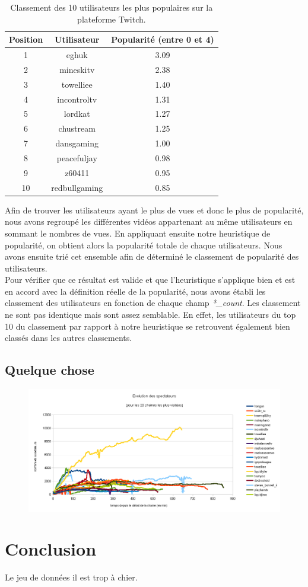 \documentclass[11pt, a4paper, titlepage]{scrartcl}
\begin{document}
\begin{table}[h]
  \centering
   \caption{\label{tab:user_rank} Classement des 10 utilisateurs les plus populaires
   sur la plateforme Twitch.}
   \begin{tabular}{|c|c|c|}
     \hline
     Position & Utilisateur & Popularité (entre 0 et 4) \\
     \hline
      1 & eghuk & 3.09 \\
      2 & mineskitv & 2.38 \\
      3 & towelliee & 1.40 \\
      4 & incontroltv & 1.31 \\
      5 & lordkat & 1.27 \\
      6 & chustream & 1.25 \\
      7 & dansgaming & 1.00 \\
      8 & peacefuljay & 0.98 \\
      9 & z60411 & 0.95 \\
      10 & redbullgaming & 0.85 \\
     \hline
  \end{tabular}
\end{table}

Afin de trouver les utilisateurs ayant le plus de vues et donc le plus de
popularité, nous avons regroupé les différentes vidéos appartenant au même
utilisateurs en sommant le nombres de vues. En appliquant ensuite notre
heuristique de popularité, on obtient alors la popularité totale de chaque
utilisateurs. Nous avons ensuite trié cet ensemble afin de déterminé le
classement de popularité des utilisateurs. \\

Pour vérifier que ce résultat est valide et que l'heuristique s'applique bien
et est en accord avec la définition réelle de la popularité, nous avons établi
les classement des utilisateurs en fonction de chaque champ \textit{*\_count}.
Les classement ne sont pas identique mais sont assez semblable. En effet, les
utilisateurs du top 10 du classement par rapport à notre heuristique se
retrouvent également bien classés dans les autres classements. \\

\subsection{Quelque chose}
\begin{figure}[h]
    \centering
    \includegraphics[width=\textwidth]{images/top_20_view_evolutions}
    \caption{}
\end{figure}

\section{Conclusion}

Le jeu de données il est trop à chier.
\end{document}
